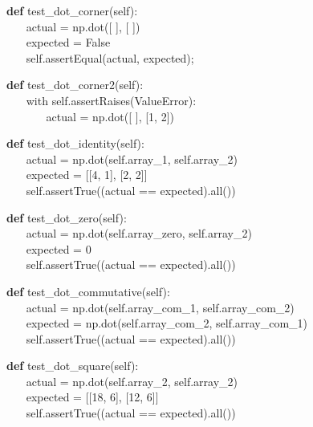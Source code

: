 \documentclass[a4paper,11pt]{article}
\begin{document}
\begin{algorithm}[H]
	\textbf{def} test\_dot\_corner(self):
	\\ $ ~~~~~~~~ $actual = np.dot([ ], [ ])
	\\ $ ~~~~~~~~ $expected = False
	\\ $ ~~~~~~~~ $self.assertEqual(actual, expected);
\end{algorithm}

\begin{algorithm}[H]
	\textbf{def} test\_dot\_corner2(self):
	\\ $ ~~~~~~~~ $with self.assertRaises(ValueError):
	\\ $ ~~~~~~~~~~~~~~~~ $actual = np.dot([ ], [1, 2])
\end{algorithm}

\begin{algorithm}[H]
	\textbf{def} test\_dot\_identity(self):
	\\ $ ~~~~~~~~ $actual = np.dot(self.array\_1, self.array\_2)
	\\ $ ~~~~~~~~ $expected = [[4, 1], [2, 2]]
	\\ $ ~~~~~~~~ $self.assertTrue((actual == expected).all())
\end{algorithm}

\begin{algorithm}[H]
	\textbf{def} test\_dot\_zero(self):
	\\ $ ~~~~~~~~ $actual = np.dot(self.array\_zero, self.array\_2)
	\\ $ ~~~~~~~~ $expected = 0
	\\ $ ~~~~~~~~ $self.assertTrue((actual == expected).all())
\end{algorithm}

\begin{algorithm}[H]
    \textbf{def} test\_dot\_commutative(self):
\\ $ ~~~~~~~~ $actual = np.dot(self.array\_com\_1, self.array\_com\_2)
\\ $ ~~~~~~~~ $expected = np.dot(self.array\_com\_2, self.array\_com\_1)
\\ $ ~~~~~~~~ $self.assertTrue((actual == expected).all())
\end{algorithm}

\begin{algorithm}[H]
    \textbf{def} test\_dot\_square(self):
\\ $ ~~~~~~~~ $actual = np.dot(self.array\_2, self.array\_2)
\\ $ ~~~~~~~~ $expected = [[18, 6], [12, 6]]
\\ $ ~~~~~~~~ $self.assertTrue((actual == expected).all())
\end{algorithm}
\end{document}
